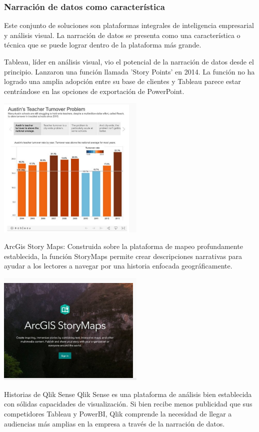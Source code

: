 \documentclass[twoside,twocolumn]{article}
\begin{document}
\subsubsection{Narración de datos como característica} 
Este conjunto de soluciones son plataformas integrales de inteligencia empresarial y análisis visual. La narración de datos se presenta como una característica o técnica que se puede lograr dentro de la plataforma más grande.

Tableau, líder en análisis visual, vio el potencial de la narración de datos desde el principio. Lanzaron una función llamada 'Story Points' en 2014. La función no ha logrado una amplia adopción entre su base de clientes y Tableau parece estar centrándose en las opciones de exportación de PowerPoint.

\includegraphics[width=7cm]{imagenes/img4.png}

ArcGis Story Maps: Construida sobre la plataforma de mapeo profundamente establecida, la función StoryMaps permite crear descripciones narrativas para ayudar a los lectores a navegar por una historia enfocada geográficamente.

\includegraphics[width=7cm]{imagenes/img5.png}

Historias de Qlik Sense
Qlik Sense es una plataforma de análisis bien establecida con sólidas capacidades de visualización. Si bien recibe menos publicidad que sus competidores Tableau y PowerBI, Qlik comprende la necesidad de llegar a audiencias más amplias en la empresa a través de la narración de datos.
\end{document}
